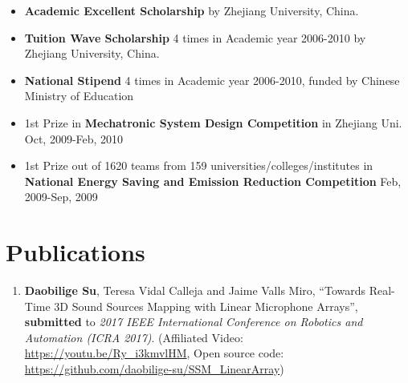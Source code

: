 \documentclass[margin,line]{res}
\begin{document}
\begin{resume}
\begin{itemize}
\vspace*{-2.5mm}
\item {\bf Academic Excellent Scholarship} by Zhejiang University, China.

\vspace*{-2.5mm}
\item {\bf Tuition Wave Scholarship} 4 times in Academic year 2006-2010 by Zhejiang University, China.

\vspace*{-2.5mm}
\item {\bf National Stipend} 4 times in Academic year 2006-2010, funded by Chinese Ministry of Education

\vspace*{-2.5mm}
\item 1st Prize in {\bf Mechatronic System Design Competition} in Zhejiang Uni. Oct, 2009-Feb, 2010

\vspace*{-2.5mm}
\item 1st Prize out of 1620 teams from 159 universities/colleges/institutes in {\bf National Energy Saving and Emission Reduction Competition} Feb, 2009-Sep, 2009


\end{itemize}


\section{\sc Publications}
%
%
\begin{enumerate}

\item {\bf Daobilige Su}, Teresa Vidal Calleja and Jaime Valls Miro, ``Towards Real-Time 3D Sound Sources Mapping with Linear Microphone Arrays'', {\bf submitted} to {\it 2017 IEEE International Conference on Robotics and Automation (ICRA 2017)}. %
(Affiliated Video: \\ \href{https://youtu.be/Ry_i3kmvlHM}{{https://youtu.be/Ry\_i3kmvlHM}}, Open source code: \\ \href{https://github.com/daobilige-su/SSM_LinearArray}{{https://github.com/daobilige-su/SSM\_LinearArray}})


\end{enumerate}
\end{resume}
\end{document}
